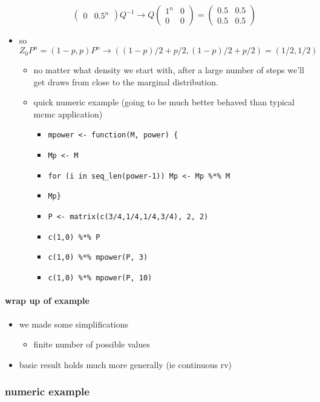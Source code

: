 \begin{itemize}
\[\begin{pmatrix}
    0 & 0.5^n \end{pmatrix} Q^{-1} \to Q \begin{pmatrix} 1^n & 0 \\ 0 &
    0 \end{pmatrix} = \begin{pmatrix} 0.5 & 0.5 \\ 0.5 &
    0.5 \end{pmatrix}\]
\item so $Z_0 P^n = (1-p, p) P^n \to ((1-p)/2 + p/2, (1-p)/2 + p/2) =
  (1/2, 1/2)$
\begin{itemize}
\item no matter what density we start with, after a large number
          of steps we'll get draws from close to the marginal
          distribution.
\item quick numeric example (going to be much better behaved than
          typical mcmc application)
\begin{itemize}
\item \texttt{mpower <- function(M, power) \{}
\item \texttt{Mp <- M}
\item \texttt{for (i in seq\_len(power-1)) Mp <- Mp \%*\% M}
\item \texttt{Mp\}}
\item \texttt{P <- matrix(c(3/4,1/4,1/4,3/4), 2, 2)}
\item \texttt{c(1,0) \%*\% P}
\item \texttt{c(1,0) \%*\% mpower(P, 3)}
\item \texttt{c(1,0) \%*\% mpower(P, 10)}
\end{itemize}
\end{itemize}
\end{itemize}

\paragraph{wrap up of example}
\begin{itemize}
\item we made some simplifications
\begin{itemize}
\item finite number of possible values
\end{itemize}
\item basic result holds much more generally (ie continuous rv)
\end{itemize}

\subsubsection{numeric example}

